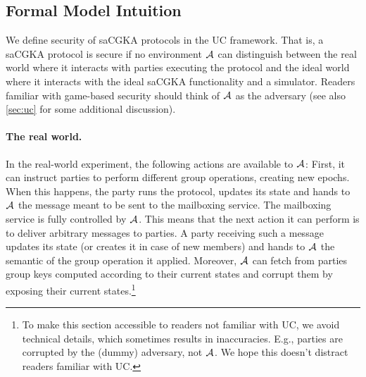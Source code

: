 \subsection{Formal Model Intuition}
We define security of saCGKA protocols in the UC framework. That is, a saCGKA protocol is secure if no environment $\mathcal{A}_{\relax}$ can distinguish between the real world where it interacts with parties executing the protocol and the ideal world where it interacts with the ideal saCGKA functionality and a simulator. Readers familiar with game-based security should think of $\mathcal{A}_{\relax}$ as the adversary (see also \cref{sec:uc} for some additional discussion).

\paragraph{The real world.}
In the real-world experiment, the following actions are available to $\mathcal{A}_{\relax}$: First, it can instruct parties to perform
different group operations, creating new epochs. When this happens, the party runs the protocol, updates its state and
hands to $\mathcal{A}_{\relax}$ the message meant to be sent to the mailboxing service. The mailboxing service is fully controlled by
$\mathcal{A}_{\relax}$. This means that the next action it can perform is to deliver arbitrary messages to parties. A party receiving
such a message updates its state (or creates it in case of new members) and hands to $\mathcal{A}_{\relax}$ the semantic of the group operation it applied. Moreover, $\mathcal{A}_{\relax}$ can fetch from parties group keys computed according to their current states and corrupt them by exposing their current states.\footnote{To
	make this section accessible to readers not familiar with UC, we avoid technical details, which sometimes results in inaccuracies. E.g., parties are corrupted by the (dummy) adversary, not $\mathcal{A}_{\relax}$. We hope this doesn't distract readers familiar with UC.}

